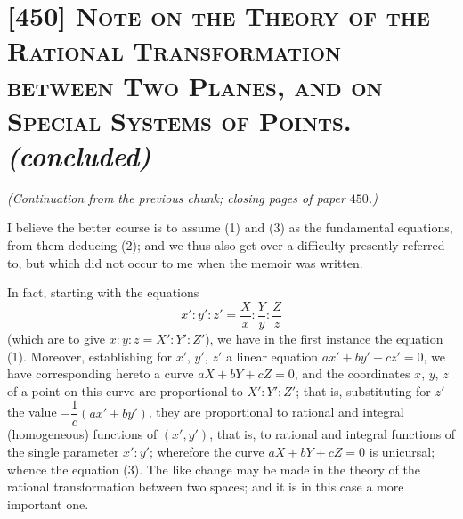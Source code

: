 \documentclass[11pt,a4paper]{article}
\begin{document}
\section*{[450] \textsc{Note on the Theory of the Rational Transformation
between Two Planes, and on Special Systems of Points.} \textit{(concluded)}}

\medskip
\noindent\textit{(Continuation from the previous chunk; closing pages of paper $450$.)}

\bigskip

I believe the better course is to assume (1) and (3) as the fundamental
equations, from them deducing (2); and we thus also get over a difficulty
presently referred to, but which did not occur to me when the memoir was
written.

In fact, starting with the equations
\[
x' : y' : z' = \frac{X}{x} : \frac{Y}{y} : \frac{Z}{z}
\]
(which are to give $x : y : z = X' : Y' : Z'$), we have in the first instance
the equation (1). Moreover, establishing for $x'$, $y'$, $z'$ a linear
equation $ax' + by' + cz' = 0$, we have corresponding hereto a curve
$aX + bY + cZ = 0$, and the coordinates $x$, $y$, $z$ of a point on this
curve are proportional to $X' : Y' : Z'$; that is, substituting for $z'$
the value $-\dfrac{1}{c}(ax' + by')$, they are proportional to rational and
integral (homogeneous) functions of $(x', y')$, that is, to rational and
integral functions of the single parameter $x' : y'$; wherefore the curve
$aX + bY + cZ = 0$ is unicursal; whence the equation (3). The like change
may be made in the theory of the rational transformation between two
spaces; and it is in this case a more important one.

\medskip
\end{document}

